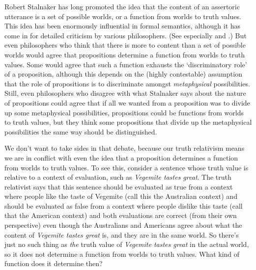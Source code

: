 Robert Stalnaker has long promoted the idea that the content of an assertoric utterance is a set of possible worlds, or a function from worlds to truth values. This idea has been enormously influential in formal semantics, although it has come in for detailed criticism by various philosophers. (See especially \citet{Soames1987} and \citet{King1994, King1995, King1998}.) But even philosophers who think that there is more to content than a set of possible worlds would agree that propositions determine a function from worlds to truth values. Some would agree that such a function exhausts the `discriminatory role' of a proposition, although this depends on the (highly contestable) assumption that the role of propositions is to discriminate amongst \textit{metaphysical} possibilities. Still, even philosophers who disagree with what Stalnaker says about the nature of propositions could agree that if all we wanted from a proposition was to divide up some metaphysical possibilities, propositions could be functions from worlds to truth values, but they think some propositions that divide up the metaphysical possibilities the same way should be distinguished.
 
We don't want to take sides in that debate, because our truth relativism means we are in conflict with even the idea that a proposition determines a function from worlds to truth values. To see this, consider a sentence whose truth value is relative to a context of evaluation, such as \textit{Vegemite tastes great}. The truth relativist says that this sentence should be evaluated as true from a context where people like the taste of Vegemite (call this the Australian context) and should be evaluated as false from a context where people dislike this taste (call that the American context) and both evaluations are correct (from their own perspective) even though the Australians and Americans agree about what the content of \textit{Vegemite tastes great} is, and they are in the same world. So there's just no such thing as \textit{the} truth value of \textit{Vegemite tastes great} in the actual world, so it does not determine a function from worlds to truth values. What kind of function does it determine then?
 
